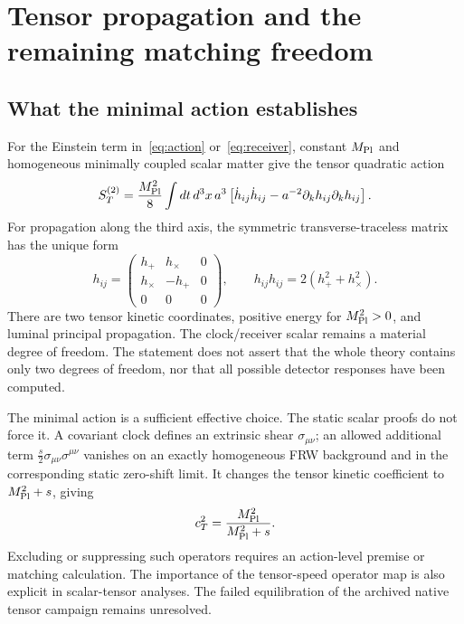 \documentclass[11pt]{article}
\begin{document}
\section{Tensor propagation and the remaining matching freedom}
\subsection{What the minimal action establishes}
For the Einstein term in~\eqref{eq:action} or~\eqref{eq:receiver}, constant
$M_{\rm Pl}$ and homogeneous minimally coupled scalar matter give the tensor
quadratic action
\begin{equation}
 S_T^{(2)}=\frac{M_{\rm Pl}^2}{8}\int dt\,d^3x\,a^3
 \left[\dot h_{ij}\dot h_{ij}-a^{-2}\partial_kh_{ij}\partial_kh_{ij}\right].
\end{equation}
For propagation along the third axis, the symmetric transverse-traceless
matrix has the unique form
\begin{equation}
 h_{ij}=\begin{pmatrix}h_+&h_\times&0\\h_\times&-h_+&0\\0&0&0\end{pmatrix},
 \qquad h_{ij}h_{ij}=2(h_+^2+h_\times^2).
\end{equation}
There are two tensor kinetic coordinates, positive energy for
$M_{\rm Pl}^2>0$, and luminal principal propagation. The clock/receiver scalar
remains a material degree of freedom. The statement does not assert that
the whole theory contains only two degrees of freedom, nor that all possible
detector responses have been computed.

The minimal action is a sufficient effective choice. The static scalar
proofs do not force it. A covariant clock defines an extrinsic shear
$\sigma_{\mu\nu}$; an allowed additional term
$\frac{s}{2}\sigma_{\mu\nu}\sigma^{\mu\nu}$ vanishes on an exactly homogeneous
FRW background and in the corresponding static zero-shift limit. It changes
the tensor kinetic coefficient to $M_{\rm Pl}^2+s$, giving
\begin{equation}
 c_T^2=\frac{M_{\rm Pl}^2}{M_{\rm Pl}^2+s}.
\end{equation}
Excluding or suppressing such operators requires an action-level premise or
matching calculation. The importance of the tensor-speed operator map is
also explicit in scalar-tensor analyses\cite{Ezquiaga}. The failed
equilibration of the archived native tensor campaign remains unresolved.
\end{document}
